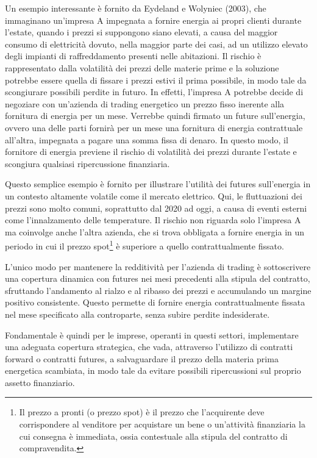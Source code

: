 \documentclass[12pt,a4paper]{report}
\begin{document}
Un esempio interessante è fornito da Eydeland e Wolyniec (2003), che immaginano un'impresa A impegnata a fornire energia ai propri clienti durante l'estate, quando i prezzi si suppongono siano elevati, a causa del maggior consumo di elettricità dovuto, nella maggior parte dei casi, ad un utilizzo elevato degli impianti di raffreddamento presenti nelle abitazioni. Il rischio è rappresentato dalla volatilità dei prezzi delle materie prime e la soluzione potrebbe essere quella di fissare i prezzi estivi il prima possibile, in modo tale da scongiurare possibili perdite in futuro. In effetti,  l'impresa A potrebbe decide di negoziare con un'azienda di trading energetico un prezzo fisso inerente alla fornitura di energia per un mese. Verrebbe quindi firmato un future sull'energia, ovvero una delle parti fornirà per un mese una fornitura di energia contrattuale all'altra, impegnata a pagare una somma fissa di denaro. In questo modo, il fornitore di energia previene il rischio di volatilità dei prezzi durante l'estate e scongiura qualsiasi ripercussione finanziaria. 

Questo semplice esempio è fornito per illustrare l'utilità dei futures sull'energia in un contesto altamente volatile come il mercato elettrico. Qui, le fluttuazioni dei prezzi sono molto comuni, soprattutto dal 2020 ad oggi, a causa di eventi esterni come l'innalzamento delle temperature. Il rischio non riguarda solo l'impresa A ma coinvolge anche l'altra azienda, che si trova obbligata a fornire energia in un periodo in cui il prezzo spot\footnote{Il prezzo a pronti (o prezzo spot) è il prezzo che l'acquirente deve corrispondere al venditore per acquistare un bene o un'attività finanziaria la cui consegna è immediata, ossia contestuale alla stipula del contratto di compravendita.} è superiore a quello contrattualmente fissato.

L'unico modo per mantenere la redditività per l'azienda di trading è sottoscrivere una copertura dinamica con futures nei mesi precedenti alla stipula del contratto, sfruttando l'andamento al rialzo e al ribasso dei prezzi e accumulando un margine positivo consistente. Questo permette di fornire energia contrattualmente fissata nel mese specificato alla controparte, senza subire perdite indesiderate.


Fondamentale è quindi per le imprese, operanti in questi settori, implementare una adeguata copertura strategica, che vada, attraverso l'utilizzo di contratti forward o contratti futures, a salvaguardare il prezzo della materia prima energetica scambiata, in modo tale da evitare possibili ripercussioni sul proprio assetto finanziario.  
\end{document}
